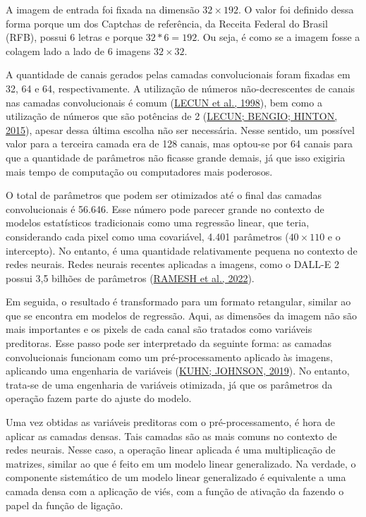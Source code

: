 \documentclass[12pt,twoside,brazilian]{book}
\begin{document}
A imagem de entrada foi fixada na dimensão \(32\times192\). O valor foi
definido dessa forma porque um dos Captchas de referência, da Receita
Federal do Brasil (RFB), possui 6 letras e porque \(32*6=192\). Ou seja,
é como se a imagem fosse a colagem lado a lado de 6 imagens
\(32\times32\).

A quantidade de canais gerados pelas camadas convolucionais foram
fixadas em 32, 64 e 64, respectivamente. A utilização de números
não-decrescentes de canais nas camadas convolucionais é comum
(\protect\hyperlink{ref-lecun1998}{LECUN et al., 1998}), bem como a
utilização de números que são potências de 2
(\protect\hyperlink{ref-lecun2015}{LECUN; BENGIO; HINTON, 2015}), apesar
dessa última escolha não ser necessária. Nesse sentido, um possível
valor para a terceira camada era de 128 canais, mas optou-se por 64
canais para que a quantidade de parâmetros não ficasse grande demais, já
que isso exigiria mais tempo de computação ou computadores mais
poderosos.

O total de parâmetros que podem ser otimizados até o final das camadas
convolucionais é 56.646. Esse número pode parecer grande no contexto de
modelos estatísticos tradicionais como uma regressão linear, que teria,
considerando cada pixel como uma covariável, 4.401 parâmetros
(\(40\times110\) e o intercepto). No entanto, é uma quantidade
relativamente pequena no contexto de redes neurais. Redes neurais
recentes aplicadas a imagens, como o DALL-E 2 possui 3,5 bilhões de
parâmetros
(\protect\hyperlink{ref-rameshHierarchicalTextConditionalImage2022}{RAMESH
et al., 2022}).

Em seguida, o resultado é transformado para um formato retangular,
similar ao que se encontra em modelos de regressão. Aqui, as dimensões
da imagem não são mais importantes e os pixels de cada canal são
tratados como variáveis preditoras. Esse passo pode ser interpretado da
seguinte forma: as camadas convolucionais funcionam como um
pré-processamento aplicado às imagens, aplicando uma engenharia de
variáveis (\protect\hyperlink{ref-kuhn2019}{KUHN; JOHNSON, 2019}). No
entanto, trata-se de uma engenharia de variáveis otimizada, já que os
parâmetros da operação fazem parte do ajuste do modelo.

Uma vez obtidas as variáveis preditoras com o pré-processamento, é hora
de aplicar as camadas densas. Tais camadas são as mais comuns no
contexto de redes neurais. Nesse caso, a operação linear aplicada é uma
multiplicação de matrizes, similar ao que é feito em um modelo linear
generalizado. Na verdade, o componente sistemático de um modelo linear
generalizado é equivalente a uma camada densa com a aplicação de viés,
com a função de ativação da fazendo o papel da função de ligação.
\end{document}
